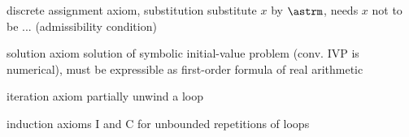 \begin{calculus}
        \cinferenceRule[Ib|I]{}{
            \linferenceRule[impl]{
                \dbox{\hrepeat{\asprg}}{(\asfml\limply\dbox{\asprg}{\asfml})}
            }{
                (\asfml\limply\dbox{\hrepeat{\asprg}}{\asfml})
            }
        }{}
        \cinferenceRule[Vb|V]{}{
            \linferenceRule[impl]{
                \asfml
            }{
                \dbox{\asprg}{\asfml}
            }
        }{$\freevars{\asfml}\cap\boundvars{\asprg}=\emptyset$}


    \end{calculus}

    discrete assignment axiom, substitution
    substitute $x$ by $\astrm$, needs $x$ not to be ... (admissibility condition)

    solution axiom
    solution of symbolic initial-value problem (conv. IVP is numerical), must be expressible as first-order formula of real arithmetic

    iteration axiom
    partially unwind a loop

    induction axioms I and C for unbounded repetitions of loops

